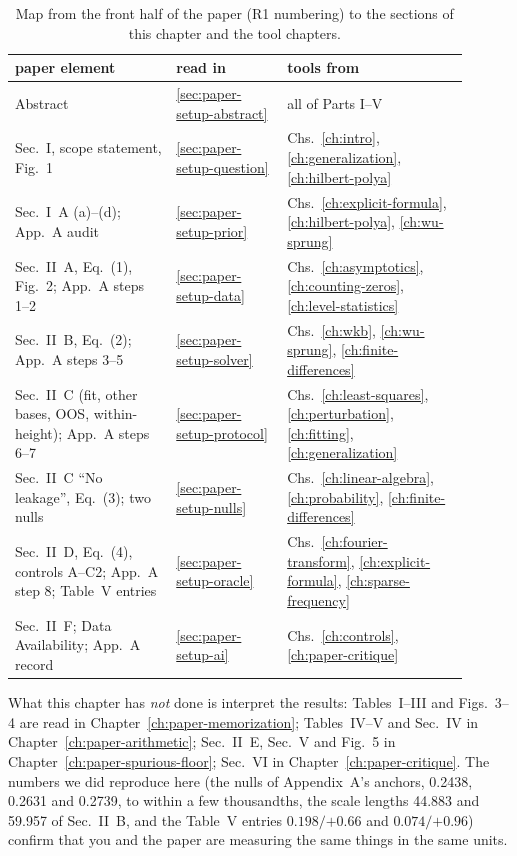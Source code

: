 \begin{table}[htbp]\centering
\caption{Map from the front half of the paper (R1 numbering) to the sections of this chapter and the tool chapters.}\label{tab:paper-setup-map}
\small
\begin{tabular}{p{0.32\linewidth}p{0.22\linewidth}p{0.36\linewidth}}
\toprule
paper element & read in & tools from \\
\midrule
Abstract & \cref{sec:paper-setup-abstract} & all of Parts I--V \\
Sec.~I, scope statement, Fig.~1 & \cref{sec:paper-setup-question} & Chs.~\ref{ch:intro}, \ref{ch:generalization}, \ref{ch:hilbert-polya} \\
Sec.~I~A (a)--(d); App.~A audit & \cref{sec:paper-setup-prior} & Chs.~\ref{ch:explicit-formula}, \ref{ch:hilbert-polya}, \ref{ch:wu-sprung} \\
Sec.~II~A, Eq.~(1), Fig.~2; App.~A steps 1--2 & \cref{sec:paper-setup-data} & Chs.~\ref{ch:asymptotics}, \ref{ch:counting-zeros}, \ref{ch:level-statistics} \\
Sec.~II~B, Eq.~(2); App.~A steps 3--5 & \cref{sec:paper-setup-solver} & Chs.~\ref{ch:wkb}, \ref{ch:wu-sprung}, \ref{ch:finite-differences} \\
Sec.~II~C (fit, other bases, OOS, within-height); App.~A steps 6--7 & \cref{sec:paper-setup-protocol} & Chs.~\ref{ch:least-squares}, \ref{ch:perturbation}, \ref{ch:fitting}, \ref{ch:generalization} \\
Sec.~II~C ``No leakage'', Eq.~(3); two nulls & \cref{sec:paper-setup-nulls} & Chs.~\ref{ch:linear-algebra}, \ref{ch:probability}, \ref{ch:finite-differences} \\
Sec.~II~D, Eq.~(4), controls A--C2; App.~A step 8; Table~V entries & \cref{sec:paper-setup-oracle} & Chs.~\ref{ch:fourier-transform}, \ref{ch:explicit-formula}, \ref{ch:sparse-frequency} \\
Sec.~II~F; Data Availability; App.~A record & \cref{sec:paper-setup-ai} & Chs.~\ref{ch:controls}, \ref{ch:paper-critique} \\
\bottomrule
\end{tabular}
\end{table}

What this chapter has \emph{not} done is interpret the results: Tables~I--III and Figs.~3--4 are read in Chapter~\ref{ch:paper-memorization}; Tables~IV--V and Sec.~IV in Chapter~\ref{ch:paper-arithmetic}; Sec.~II~E, Sec.~V and Fig.~5 in Chapter~\ref{ch:paper-spurious-floor}; Sec.~VI in Chapter~\ref{ch:paper-critique}. The numbers we did reproduce here (the nulls of Appendix~A's anchors, 0.2438, 0.2631 and 0.2739, to within a few thousandths, the scale lengths 44.883 and 59.957 of Sec.~II~B, and the Table~V entries $0.198/{+0.66}$ and $0.074/{+0.96}$) confirm that you and the paper are measuring the same things in the same units.

